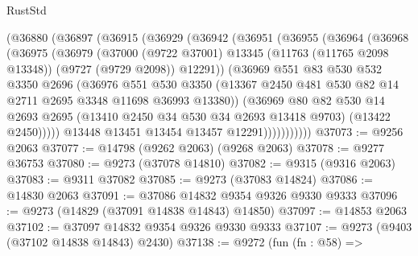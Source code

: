 \begin{lexlean}{RustStd}
\begin{coremodule}
          (@36880
            (@36897
              (@36915
                (@36929
                  (@36942
                    (@36951
                      (@36955
                        (@36964
                          (@36968
                            (@36975
                              (@36979
                                (@37000
                                  (@9722 @37001)
                                  @13345
                                  (@11763 (@11765 @2098 @13348))
                                  (@9727 (@9729 @2098))
                                  @12291))
                              (@36969
                                @551
                                @83
                                @530
                                @532
                                @3350
                                @2696
                                (@36976
                                  @551
                                  @530
                                  @3350
                                  (@13367
                                    @2450
                                    @481
                                    @530
                                    @82
                                    @14
                                    @2711
                                    @2695
                                    @3348
                                    @11698
                                    @36993
                                    @13380))
                                (@36969
                                  @80
                                  @82
                                  @530
                                  @14
                                  @2693
                                  @2695
                                  (@13410 @2450 @34 @530 @34 @2693 @13418 @9703)
                                  (@13422 @2450)))))
                          @13448
                          @13451
                          @13454
                          @13457
                          @12291)))))))))))
@37073 := @9256 @2063
@37077 := @14798 (@9262 @2063) (@9268 @2063)
@37078 := @9277 @36753
@37080 := @9273 (@37078 @14810)
@37082 := @9315 (@9316 @2063)
@37083 := @9311 @37082
@37085 := @9273 (@37083 @14824)
@37086 := @14830 @2063
@37091 := @37086 @14832 @9354 @9326 @9330 @9333
@37096 := @9273 (@14829 (@37091 @14838 @14843) @14850)
@37097 := @14853 @2063
@37102 := @37097 @14832 @9354 @9326 @9330 @9333
@37107 := @9273 (@9403 (@37102 @14838 @14843) @2430)
@37138 := @9272
    (fun (fn : @58) =>

\end{coremodule}
\end{lexlean}
